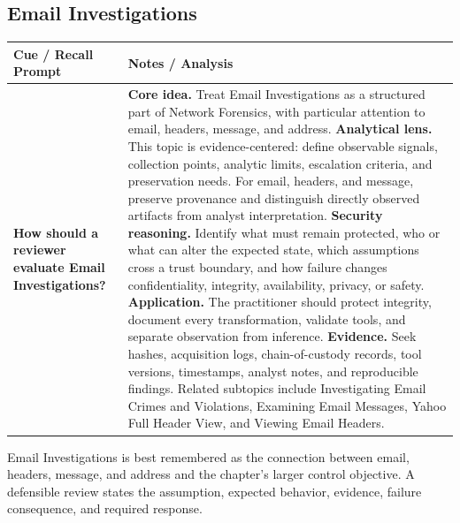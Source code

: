 \documentclass[11pt]{article}
\newcommand{\CornellHeader}{%
\rowcolor{Navy}\color{white}\bfseries Cue / Recall Prompt & \color{white}\bfseries Notes / Analysis\\\hline}
\newcommand{\CornellRow}[2]{%
\cellcolor{CueGray}\RaggedRight\textbf{#1} & \RaggedRight #2\\\hline}
\begin{document}
\subsection*{Email Investigations}
\begin{longtable}{>{\RaggedRight\arraybackslash}p{}|>{\RaggedRight\arraybackslash}p{}}
\CornellHeader
\CornellRow{How should a reviewer evaluate Email Investigations?}{\textbf{Core idea.} Treat Email Investigations as a structured part of Network Forensics, with particular attention to email, headers, message, and address. \textbf{Analytical lens.} This topic is evidence-centered: define observable signals, collection points, analytic limits, escalation criteria, and preservation needs. For email, headers, and message, preserve provenance and distinguish directly observed artifacts from analyst interpretation. \textbf{Security reasoning.} Identify what must remain protected, who or what can alter the expected state, which assumptions cross a trust boundary, and how failure changes confidentiality, integrity, availability, privacy, or safety. \textbf{Application.} The practitioner should protect integrity, document every transformation, validate tools, and separate observation from inference. \textbf{Evidence.} Seek hashes, acquisition logs, chain-of-custody records, tool versions, timestamps, analyst notes, and reproducible findings. Related subtopics include Investigating Email Crimes and Violations, Examining Email Messages, Yahoo Full Header View, and Viewing Email Headers.}
\end{longtable}
\begin{topicsummary}
Email Investigations is best remembered as the connection between email, headers, message, and address and the chapter's larger control objective. A defensible review states the assumption, expected behavior, evidence, failure consequence, and required response.
\end{topicsummary}
\end{document}

